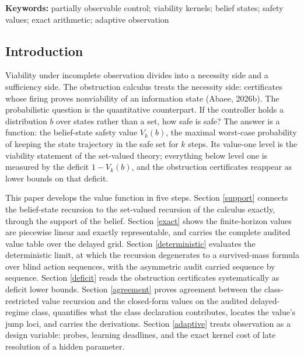 \documentclass[10pt,twocolumn]{article}
\theoremstyle{plain}
\theoremstyle{definition}
\theoremstyle{remark}
\begin{document}
\begin{abstract}
the declining hidden-parameter instance a single probe reveals the
parameter exactly (branch separation \(2\)), survival forces
\(z_{0} \ge 21/10\), and under revelation at horizon \(T_{\mathrm{learn}}\)
viability holds exactly when
\(z_{0} \ge 21/10 + T_{\mathrm{learn}}/10\) --- the learning deadline acts
as the timing obstruction's observation deadline, and the kernel shrinks
linearly and antitone in it (\(|K| = 5, 4, 3, 2, 1\)). All computations run
in exact rational arithmetic; this edition carries the complete audited
tables, the derivations behind the closed form and the class declaration,
and a five-figure set regenerated from the verification scripts.
\end{abstract}

\textbf{Keywords:} partially observable control; viability kernels;
belief states; safety values; exact arithmetic; adaptive observation

\subsection{Introduction}\label{introduction}

Viability under incomplete observation divides into a necessity side and a
sufficiency side. The obstruction calculus treats the necessity side:
certificates whose firing proves nonviability of an information state
(Abaee, 2026b). The probabilistic question is the quantitative counterpart.
If the controller holds a distribution \(b\) over states rather than a set,
how safe is safe? The answer is a function: the belief-state safety value
\(V_{k}(b)\), the maximal worst-case probability of keeping the state
trajectory in the safe set for \(k\) steps. Its value-one level is the
viability statement of the set-valued theory; everything below level one
is measured by the deficit \(1 - V_{k}(b)\), and the obstruction
certificates reappear as lower bounds on that deficit.

This paper develops the value function in five steps. Section
\ref{support} connects the belief-state recursion to the set-valued
recursion of the calculus exactly, through the support of the belief.
Section \ref{exact} shows the finite-horizon values are piecewise linear
and exactly representable, and carries the complete audited value table
over the delayed grid. Section \ref{deterministic} evaluates the
deterministic limit, at which the recursion degenerates to a
survived-mass formula over blind action sequences, with the asymmetric
audit carried sequence by sequence. Section \ref{deficit} reads the
obstruction certificates systematically as deficit lower bounds. Section
\ref{agreement} proves agreement between the class-restricted value
recursion and the closed-form values on the audited delayed-regime class,
quantifies what the class declaration contributes, locates the value's
jump loci, and carries the derivations. Section \ref{adaptive} treats
observation as a design variable: probes, learning deadlines, and the
exact kernel cost of late resolution of a hidden parameter.
\end{document}
